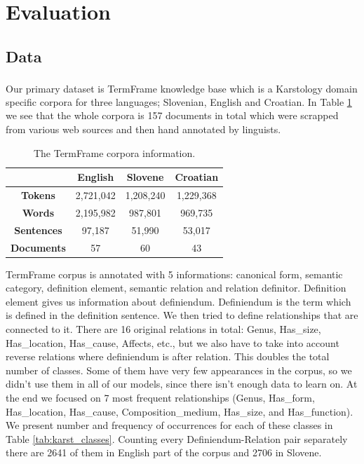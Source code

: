 \documentclass[fleqn,moreauthors,10pt]{ds_report}
\begin{document}

\section{Evaluation}
\subsection{Data}
\par Our primary dataset is TermFrame knowledge base\textsuperscript{\cite{Vintar2019ModellingSK}} which is a Karstology domain specific corpora for three languages; Slovenian, English and Croatian. In Table \ref{tab:karst} we see that the whole corpora is 157 documents in total which were scrapped from various web sources and then hand annotated by linguists. 

\begin{table}[h]
\begin{center}
    \begin{tabular}{ |c|| c| c | c |} 
      \hline
       & \textbf{English} & \textbf{Slovene} & \textbf{Croatian} \\ 
      \hline \hline
      \textbf{Tokens} & 2,721,042  & 1,208,240 & 1,229,368 \\ 
      \hline
      \textbf{Words} & 2,195,982  & 987,801 & 969,735 \\ 
      \hline
      \textbf{Sentences} & 97,187 & 51,990 & 53,017 \\ 
      \hline
      \textbf{Documents} & 57  & 60 & 43 \\ 
      \hline
    \end{tabular}
    \caption{The TermFrame corpora information.}
    \label{tab:karst}
\end{center}
\end{table}

\par TermFrame corpus is annotated with 5 informations: canonical form, semantic category, definition element, semantic relation and relation definitor. Definition element gives us information about definiendum. Definiendum is the term which is defined in the definition sentence. We then tried to define relationships that are connected to it. There are 16 original relations in total: Genus, Has\_size, Has\_location, Has\_cause, Affects, etc., but we also have to take into account reverse relations where definiendum is after relation. This doubles the total number of classes. Some of them have very few appearances in the corpus, so we didn't use them in all of our models, since there isn't enough data to learn on. At the end we focused on 7 most frequent relationships (Genus, Has\_form, Has\_location, Has\_cause, Composition\_medium, Has\_size, and Has\_function). We present number and frequency of occurrences for each of these classes in Table \ref{tab:karst_classes}. Counting every Definiendum-Relation pair separately there are 2641 of them in English part of the corpus and 2706 in Slovene.
\end{document}
